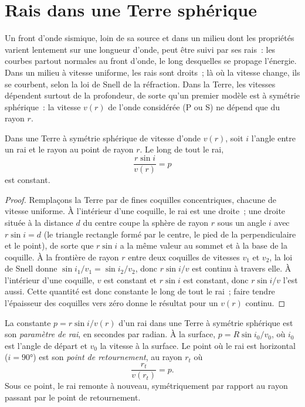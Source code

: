 \section{Rais dans une Terre sphérique}

Un front d'onde sismique, loin de sa source et dans un milieu dont les propriétés
varient lentement sur une longueur d'onde, peut être suivi par ses rais~: les courbes
partout normales au front d'onde, le long desquelles se propage l'énergie. Dans un
milieu à vitesse uniforme, les rais sont droits~; là où la vitesse change, ils
se courbent, selon la loi de Snell de la réfraction. Dans la Terre, les vitesses dépendent surtout de
la profondeur, de sorte qu'un premier modèle est à symétrie sphérique~: la vitesse $v(r)$ de
l'onde considérée (P ou S) ne dépend que du rayon $r$.

\begin{theorem}\label{thm:b3:seismology-imaging:snell}
Dans une Terre à symétrie sphérique de vitesse d'onde $v(r)$, soit $i$ l'angle
entre un rai et le rayon au point de rayon $r$. Le long de tout le rai,
\[
  \frac{r\sin i}{v(r)} = p
\]
est constant.
\end{theorem}

\begin{proof}
Remplaçons la Terre par de fines coquilles concentriques, chacune de vitesse uniforme. À l'intérieur d'une
coquille, le rai est une droite~; une droite située à la distance $d$ du
centre coupe la sphère de rayon $r$ sous un angle $i$ avec
$r\sin i = d$ (le triangle rectangle formé par le centre, le pied de la
perpendiculaire et le point), de sorte que $r\sin i$ a la même valeur au sommet et à
la base de la coquille. À la frontière de rayon $r$ entre deux coquilles de
vitesses $v_1$ et $v_2$, la loi de Snell donne $\sin i_1/v_1 = \sin i_2/v_2$, donc
$r\sin i/v$ est continu à travers elle. À l'intérieur d'une coquille, $v$ est constant et
$r\sin i$ est constant, donc $r\sin i/v$ l'est aussi. Cette quantité est donc
constante le long de tout le rai~; faire tendre l'épaisseur des coquilles vers
zéro donne le résultat pour un $v(r)$ continu.
\end{proof}

\begin{definition}\label{def:b3:seismology-imaging:ray-parameter}
La constante $p = r\sin i/v(r)$ d'un rai dans une Terre à symétrie sphérique est
son \emph{paramètre de rai}, en secondes par radian. À la
surface, $p = R\sin i_0/v_0$, où $i_0$ est l'angle de départ et $v_0$
la vitesse à la surface. Le point où le rai est horizontal ($i = \ang{90}$)
est son \emph{point de retournement},
au rayon $r_t$ où
\[
  \frac{r_t}{v(r_t)} = p .
\]
Sous ce point, le rai remonte à nouveau, symétriquement par rapport au rayon passant par le
point de retournement.
\end{definition}

